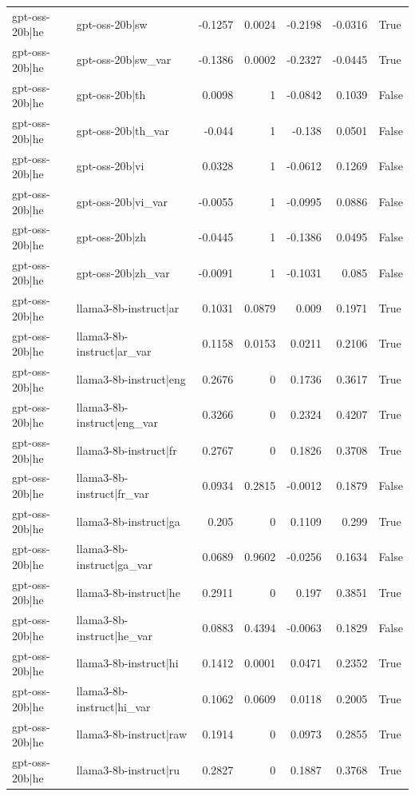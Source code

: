 \begin{table}
\begin{tabular}{l l r r r r l}
gpt-oss-20b|he & gpt-oss-20b|sw & -0.1257 & 0.0024 & -0.2198 & -0.0316 & True \\
gpt-oss-20b|he & gpt-oss-20b|sw_var & -0.1386 & 0.0002 & -0.2327 & -0.0445 & True \\
gpt-oss-20b|he & gpt-oss-20b|th & 0.0098 & 1 & -0.0842 & 0.1039 & False \\
gpt-oss-20b|he & gpt-oss-20b|th_var & -0.044 & 1 & -0.138 & 0.0501 & False \\
gpt-oss-20b|he & gpt-oss-20b|vi & 0.0328 & 1 & -0.0612 & 0.1269 & False \\
gpt-oss-20b|he & gpt-oss-20b|vi_var & -0.0055 & 1 & -0.0995 & 0.0886 & False \\
gpt-oss-20b|he & gpt-oss-20b|zh & -0.0445 & 1 & -0.1386 & 0.0495 & False \\
gpt-oss-20b|he & gpt-oss-20b|zh_var & -0.0091 & 1 & -0.1031 & 0.085 & False \\
gpt-oss-20b|he & llama3-8b-instruct|ar & 0.1031 & 0.0879 & 0.009 & 0.1971 & True \\
gpt-oss-20b|he & llama3-8b-instruct|ar_var & 0.1158 & 0.0153 & 0.0211 & 0.2106 & True \\
gpt-oss-20b|he & llama3-8b-instruct|eng & 0.2676 & 0 & 0.1736 & 0.3617 & True \\
gpt-oss-20b|he & llama3-8b-instruct|eng_var & 0.3266 & 0 & 0.2324 & 0.4207 & True \\
gpt-oss-20b|he & llama3-8b-instruct|fr & 0.2767 & 0 & 0.1826 & 0.3708 & True \\
gpt-oss-20b|he & llama3-8b-instruct|fr_var & 0.0934 & 0.2815 & -0.0012 & 0.1879 & False \\
gpt-oss-20b|he & llama3-8b-instruct|ga & 0.205 & 0 & 0.1109 & 0.299 & True \\
gpt-oss-20b|he & llama3-8b-instruct|ga_var & 0.0689 & 0.9602 & -0.0256 & 0.1634 & False \\
gpt-oss-20b|he & llama3-8b-instruct|he & 0.2911 & 0 & 0.197 & 0.3851 & True \\
gpt-oss-20b|he & llama3-8b-instruct|he_var & 0.0883 & 0.4394 & -0.0063 & 0.1829 & False \\
gpt-oss-20b|he & llama3-8b-instruct|hi & 0.1412 & 0.0001 & 0.0471 & 0.2352 & True \\
gpt-oss-20b|he & llama3-8b-instruct|hi_var & 0.1062 & 0.0609 & 0.0118 & 0.2005 & True \\
gpt-oss-20b|he & llama3-8b-instruct|raw & 0.1914 & 0 & 0.0973 & 0.2855 & True \\
gpt-oss-20b|he & llama3-8b-instruct|ru & 0.2827 & 0 & 0.1887 & 0.3768 & True \\

\end{tabular}
\end{table}
